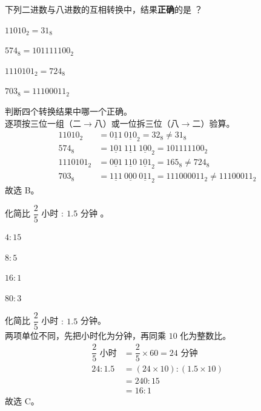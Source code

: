 \documentclass[12pt,a4paper,fontset=none]{exam-zh}
\begin{document}
\begin{question}
    下列二进数与八进数的互相转换中，结果\textbf{正确}的是 \paren[B]？
    \begin{choices}
        \item $11010_2=31_8$
        \item $574_8=101111100_2$
        \item $1110101_2=724_8$
        \item $703_8=11100011_2$
    \end{choices}
\end{question}

\begin{solution}
    判断四个转换结果中哪一个正确。 \\
    逐项按三位一组（二$\to$八）或一位拆三位（八$\to$二）验算。
    \begin{align*}
        11010_2 &= {\underline{011}\ \underline{010}}_2 = 32_8 \neq 31_8 \\
        574_8 &= {\underline{101}\ \underline{111}\ \underline{100}}_2 = 101111100_2 \\
        1110101_2 &= {\underline{001}\ \underline{110}\ \underline{101}}_2 = 165_8 \neq 724_8 \\
        703_8 &= {\underline{111}\ \underline{000}\ \underline{011}}_2 = 111000011_2 \neq 11100011_2
    \end{align*}
    故选 B。
\end{solution}

\begin{question}
    化简比 $\dfrac{2}{5}$ 小时 $:\ 1.5$ 分钟 \paren[C]。
    \begin{choices}
        \item $4:15$
        \item $8:5$
        \item $16:1$
        \item $80:3$
    \end{choices}
\end{question}

\begin{solution}
    化简比 $\dfrac{2}{5}$ 小时 $:\ 1.5$ 分钟。 \\
    两项单位不同，先把小时化为分钟，再同乘 $10$ 化为整数比。
    \begin{align*}
        \dfrac{2}{5}\text{ 小时} &= \dfrac{2}{5}\times 60 = 24\text{ 分钟} \\
        24:1.5 &= (24\times 10):(1.5\times 10) \\
        &= 240:15 \\
        &= 16:1
    \end{align*}
    故选 C。
\end{solution}
\end{document}
